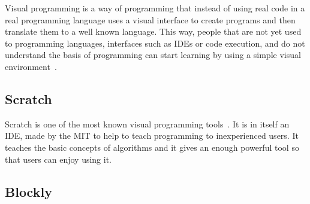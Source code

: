 Visual programming is a way of programming that instead of using real code in a real programming
language uses a visual interface to create programs and then translate them to a well known
language. This way, people that are not yet used to programming languages, interfaces such as IDEs
or code execution, and do not understand the basis of programming can start learning by using a
simple visual environment~\cite{visual_programming}.

\subsection{Scratch}

Scratch is one of the most known visual programming tools~\cite{scratch}. It is in itself an IDE,
made by the MIT to help to teach programming to inexperienced users. It teaches the basic concepts
of algorithms and it gives an enough powerful tool so that users can enjoy using it.

\subsection{Blockly}
